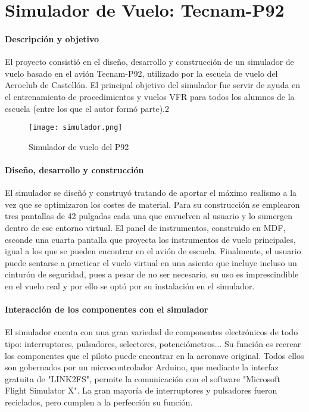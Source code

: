 \section[Simulador de Vuelo]{Simulador de Vuelo: Tecnam-P92}

\paragraph{Descripción y objetivo}

El proyecto consistió en el diseño, desarrollo y construcción de un simulador de vuelo basado en el avión Tecnam-P92, utilizado por la escuela de vuelo del Aeroclub de Castellón. El principal objetivo del simulador fue servir de ayuda en el entrenamiento de procedimientos y vuelos VFR para todos los alumnos de la escuela (entre los que el autor formó parte).2

\begin{wrapfigure}{r}{0.5\linewidth}
	\centering
	\texttt{[image: simulador.png]}
	\caption*{Simulador de vuelo del P92}
	\label{labelformat=empty}
\end{wrapfigure}

\paragraph{Diseño, desarrollo y construcción}

El simulador se diseñó y construyó tratando de aportar el máximo realismo a la vez que se optimizaron los costes de material. Para su construcción se emplearon tres pantallas de 42 pulgadas cada una que envuelven al usuario y lo sumergen dentro de ese entorno virtual. El panel de instrumentos, construido en MDF, esconde una cuarta pantalla que proyecta los instrumentos de vuelo principales, igual a los que se pueden encontrar en el avión de escuela. Finalmente, el usuario puede sentarse a practicar el vuelo virtual en una asiento que incluye incluso un cinturón de seguridad, pues a pesar de no ser necesario, su uso es imprescindible en el vuelo real y por ello se optó por su instalación en el simulador.

\paragraph{Interacción de los componentes con el simulador}
El simulador cuenta con una gran variedad de componentes electrónicos de todo tipo: interruptores, pulsadores, selectores, potenciómetros... Su función es recrear los componentes que el piloto puede encontrar en la aeronave original. Todos ellos son gobernados por un microcontrolador Arduino, que mediante la interfaz gratuita de "LINK2FS", permite la comunicación con el software "Microsoft Flight Simulator X". La gran mayoría de interruptores y pulsadores fueron reciclados, pero cumplen a la perfección su función.

